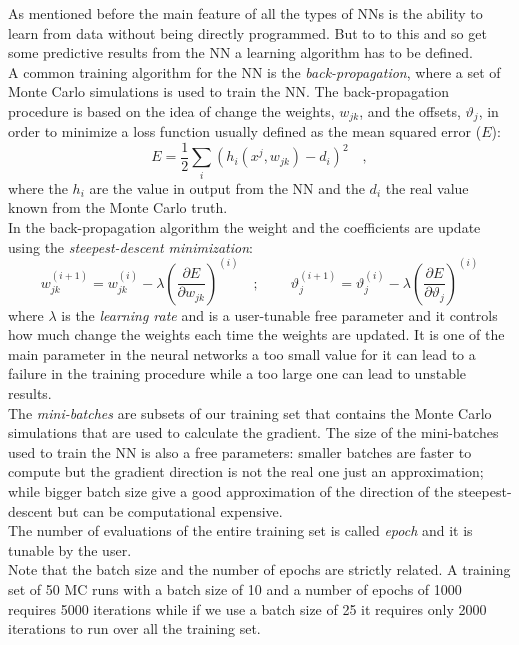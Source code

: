 \noindent As mentioned before the main feature of all the types of NNs is the ability to learn from data without being directly programmed.
But to to this and so get some predictive results from the NN a learning algorithm has to be defined.
\\
A common training algorithm for the NN is the \textit{back-propagation}, where a set of Monte Carlo simulations is used to train the NN. The back-propagation procedure is based on the idea of change the weights, $w_{jk}$, and the offsets, $\vartheta_{j}$, in order to minimize a loss function usually defined as the mean squared error ($E$):
\begin{equation}
	E=\frac{1}{2}\displaystyle\sum_i(h_{i}(x^j,w_{jk})-d_i)^2\quad,
\end{equation}  
where the $h_{i}$ are the value in output from the NN and the $d_{i}$ the real value known from the Monte Carlo truth.
\\
In the back-propagation algorithm the weight and the coefficients are update using the \textit{steepest-descent minimization}:
\begin{equation}
	w_{jk}^{(i+1)}=w_{jk}^{(i)}-\lambda\left( \frac{\partial E}{\partial w_{jk}} \right)^{(i)}
	\quad; \ \qquad
	\vartheta_{j}^{(i+1)}=\vartheta_{j}^{(i)}-\lambda\left( \frac{\partial E}{\partial \vartheta_{j}} \right)^{(i)}
	\label{eq:learning_bp}
\end{equation}
where $\lambda$ is the \textit{learning rate} and is a user-tunable free parameter and it controls how much change the weights each time the weights are updated.
It is one of the main parameter in the neural networks a too small value for it can lead to a failure in the training procedure while a too large one can lead to unstable results. 
\\
The \textit{mini-batches} are subsets of our training set that contains the Monte Carlo simulations that are used to calculate the gradient. The size of the mini-batches used to train the NN is also a free parameters: smaller batches are faster to compute but the gradient direction is not the real one just an approximation; while bigger batch size give a good approximation of the direction of the steepest-descent but can be computational expensive. 
\\
The number of evaluations of the entire training set is called \textit{epoch} and it is tunable by the user.
\\
Note that the batch size and the number of epochs are strictly related. A training set of 50 MC runs with a batch size of 10 and a number of epochs of 1000 requires 5000 iterations while if we use a batch size of 25 it requires only 2000 iterations to run over all the training set.
